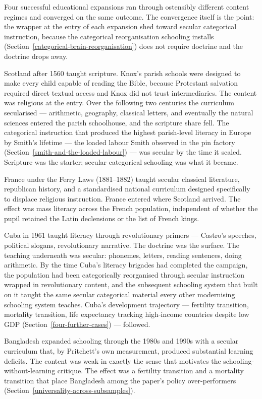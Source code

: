 \documentclass[12pt,letterpaper]{article}
\begin{document}
Four successful educational expansions ran through ostensibly different content regimes and converged on the same outcome. The convergence itself is the point: the wrapper at the entry of each expansion shed toward secular categorical instruction, because the categorical reorganisation schooling installs (Section~\ref{categorical-brain-reorganisation}) does not require doctrine and the doctrine drops away.

Scotland after 1560 taught scripture. Knox's parish schools were designed to make every child capable of reading the Bible, because Protestant salvation required direct textual access and Knox did not trust intermediaries. The content was religious at the entry. Over the following two centuries the curriculum secularised --- arithmetic, geography, classical letters, and eventually the natural sciences entered the parish schoolhouse, and the scripture share fell. The categorical instruction that produced the highest parish-level literacy in Europe by Smith's lifetime --- the loaded labour Smith observed in the pin factory (Section~\ref{smith-and-the-loaded-labour}) --- was secular by the time it scaled. Scripture was the starter; secular categorical schooling was what it became.

France under the Ferry Laws (1881--1882) taught secular classical literature, republican history, and a standardised national curriculum designed specifically to displace religious instruction. France entered where Scotland arrived. The effect was mass literacy across the French population, independent of whether the pupil retained the Latin declensions or the list of French kings.

Cuba in 1961 taught literacy through revolutionary primers --- Castro's speeches, political slogans, revolutionary narrative. The doctrine was the surface. The teaching underneath was secular: phonemes, letters, reading sentences, doing arithmetic. By the time Cuba's literacy brigades had completed the campaign, the population had been categorically reorganised through secular instruction wrapped in revolutionary content, and the subsequent schooling system that built on it taught the same secular categorical material every other modernising schooling system teaches. Cuba's development trajectory --- fertility transition, mortality transition, life expectancy tracking high-income countries despite low GDP (Section~\ref{four-further-cases}) --- followed.

Bangladesh expanded schooling through the 1980s and 1990s with a secular curriculum that, by Pritchett's own measurement, produced substantial learning deficits. The content was weak in exactly the sense that motivates the schooling-without-learning critique. The effect was a fertility transition and a mortality transition that place Bangladesh among the paper's policy over-performers (Section~\ref{universality-across-subsamples}).
\end{document}
